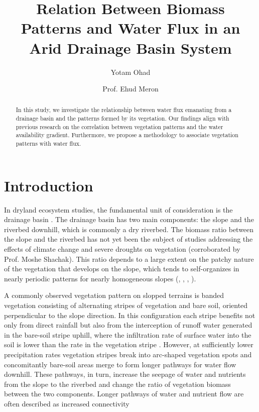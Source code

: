 \documentclass{article}
\title{Relation Between Biomass Patterns and Water Flux in an Arid Drainage Basin System}
\author{Yotam Ohad \and Prof. Ehud Meron}
\numberwithin{equation}{section}
\begin{document}
\maketitle

\begin{abstract}
    In this study, we investigate the relationship between water flux emanating from a drainage basin and the patterns formed by its vegetation. Our findings align with previous research \parencite[]{meron_vegetation_2004} on the correlation between vegetation patterns and the water availability gradient. Furthermore, we propose a methodology to associate vegetation patterns with water flux.
\end{abstract}

\section{Introduction}
In dryland ecosystem studies, the fundamental unit of consideration is the drainage basin \parencite{yair_case_1982}. The drainage basin has two main components: the slope and the riverbed downhill, which is commonly a dry riverbed. The biomass ratio between the slope and the riverbed has not yet been the subject of studies addressing the effects of climate change and severe droughts on vegetation (corroborated by Prof. Moshe Shachak). This ratio depends to a large extent on the patchy nature of the vegetation that develops on the slope, which tends to self-organizes in nearly periodic patterns for nearly homogeneous slopes (\cite{lefever_origin_1997}, \cite{valentin_soil_1999}, \cite{klausmeier_regular_1999}, \cite{von_hardenberg_diversity_2001}).

A commonly observed vegetation pattern on slopped terrains is banded vegetation consisting of alternating stripes of vegetation and bare soil, oriented perpendicular to the slope direction. In this configuration each stripe benefits not only from direct rainfall but also from the interception of runoff water generated in the bare-soil stripe uphill, where the infiltration rate of surface water into the soil is lower than the rate in the vegetation stripe \parencite{meron_vegetation_2019}. However, at sufficiently lower precipitation rates vegetation stripes break into arc-shaped vegetation spots and concomitantly bare-soil areas merge to form longer pathways for water flow downhill. These pathways, in turn, increase the seepage of water and nutrients from the slope to the riverbed and change the ratio of vegetation biomass between the two components. Longer pathways of water and nutrient flow are often described as increased connectivity \parencite{okin_connectivity_2015}
\end{document}

